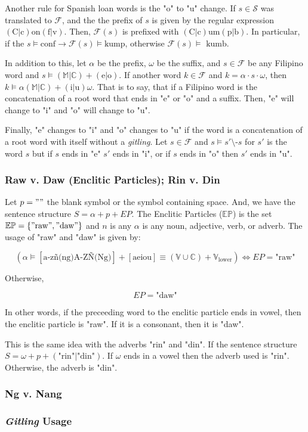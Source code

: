 Another rule for Spanish loan words is the "o" to "u" change. If \(s\in \mathcal{S}\)
was translated to \(\mathcal{F}\), and the the prefix of \(s\) is given by the
regular expression \((\text{C}|\text{c})\text{on}(\text{f}|\text{v})\). Then,
\(\mathcal{F}(s)\) is prefixed with
\((\text{C}|\text{c})\text{um}(\text{p}|\text{b})\). In particular, if the
\(s \models \text{conf} \rightarrow \mathcal{F}(s) \models \text{kump}\),
otherwise \(\mathcal{F}(s) \models \text{ kumb}\).

In addition to this, let \(\alpha\) be the prefix, \(\omega\) be the suffix, and
\(s\in\mathcal{F}\) be any Filipino word and \(s \models \mathbb{(M|C)}+(\text{e}|\text{o})\).
If another word \(k\in\mathcal{F}\) and \(k=\alpha\cdot s\cdot\omega\), then
\(k\models\alpha\mathbb{(M|C)}+(\text{i}|\text{u})\omega\). That is to say, that
if a Filipino word is the concatenation of a root word that ends in "e" or "o" and
a suffix. Then, "e" will change to "i" and "o" will change to "u".

Finally, "e" changes to "i" and "o" changes to "u" if the word is a concatenation
of a root word with itself without a \textit{gitling}. Let
\(s\in\mathcal{F}\) and \(s\models s'\text{\textbackslash}\text{-}s\)
for \(s'\) is the word \(s\) but if \(s\) ends in "e" \(s'\) ends in "i", or if
\(s\) ends in "o" then \(s'\) ends in "u".

\subsubsection{Raw v. Daw (Enclitic Particles); Rin v. Din}

Let \(p = " "\) the blank symbol or the symbol containing space. And, we have the
sentence structure \(S = \alpha + p + EP\). The Enclitic Particles (\(\mathbb{EP}\))
is the set \(\mathbb{EP} = \{"\text{raw}", "\text{daw}"\}\) and \(n\) is any \(\alpha\)
is any noun, adjective, verb, or adverb. The usage of "raw" and "daw" is given by:

\[
    \left(\alpha \models \left[\text{a-zñ(ng)A-ZÑ(Ng)}\right]+\left[\text{aeiou}\right] \equiv (\mathbb{V}\cup\mathbb{C}) + \mathbb{V}_\text{lower}\right)
    \Longleftrightarrow EP = \text{"raw"}
\]

Otherwise,

\[
    EP = \text{"daw"}
\]

In other words, if the preceeding word to the enclitic particle ends in vowel,
then the enclitic particle is "raw". If it is a consonant, then it is "daw".

This is the same idea with the adverbs "rin" and "din". If the sentence structure
\(S = \omega + p + (\text{"rin"}|\text{"din"})\). If \(\omega\) ends in a vowel
then the adverb used is "rin". Otherwise, the adverb is "din".

\subsubsection{Ng v. Nang}

\subsubsection{\textit{Gitling} Usage}